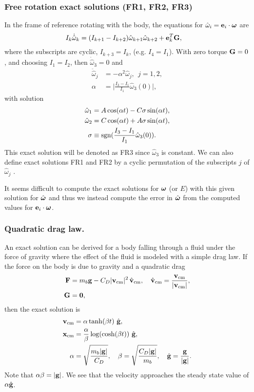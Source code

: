 \subsubsection{Free rotation exact solutions (FR1, FR2, FR3)} 

In the frame of reference rotating with the body, the equations for $\hat\omega_i = \mathbf{ e}_i\cdot\boldsymbol{\omega}$ are 
\begin{align*}
  I_k \dot{\hat\omega}_k  &= (I_{k+1}-I_{k+2}) \hat\omega_{k+1}\hat\omega_{k+2}  + \mathbf{ e}_k^T\mathbf{ G},
\end{align*}
where the subscripts are cyclic, $I_{k+3} = I_{k}$,  (e.g. $I_{4}=I_{1}$).
With zero torque $\mathbf{ G}=0$, and choosing $I_1=I_2$,  then $\dot{\hat\omega}_3=0$ and 
\begin{align*}
  \ddot{\hat\omega}_j  &= -\alpha^2 {\hat\omega}_j , ~~j=1,2, \\
  \alpha &= \Big\vert \frac{I_3-I_1}{I_1} {\hat\omega}_3(0) \Big\vert,
\end{align*}
with solution
\begin{align*}
  {\hat\omega}_1 &= A \cos(\alpha t) - C\sigma \sin(\alpha t), \\
  {\hat\omega}_2 &= C \cos(\alpha t) + A\sigma \sin(\alpha t), \\
  \sigma &\equiv \operatorname{sgn}(\frac{I_3-I_1}{I_1} {\hat\omega}_3(0)).
\end{align*}
This exact solution will be denoted as FR3 since ${\hat\omega}_3$ is constant. We can also define
exact solutions FR1 and FR2 by a cyclic permutation of the subscripts $j$ of ${\hat\omega}_j$ . 

It seems difficult to compute the exact solutions for $\boldsymbol{\omega}$ (or  $E$)
with this given solution for $\hat{\boldsymbol{\omega}}$ and thus we instead compute the error in $\hat{\boldsymbol{\omega}}$
from the computed values for $\mathbf{ e}_i\cdot\boldsymbol{\omega}$. 


\subsubsection{Quadratic drag law.}

An exact solution can be derived for a body falling through a fluid under the force of gravity where
the effect of the fluid is modeled with a simple drag law.
If the force on the body is due to gravity and a quadratic drag
\begin{align*}
  \mathbf{ F} &= m_{b} \mathbf{ g} -  C_D |\mathbf{ v}_{\rm cm}|^2\,\hat{\mathbf{ v}}_{\rm cm} , \quad \hat{\mathbf{ v}}_{\rm cm} =\frac{\mathbf{ v}_{\rm cm}}{|\mathbf{ v}_{\rm cm}|},\\
  \mathbf{ G} &= \mathbf{0},
\end{align*}
then the exact solution is
\begin{align*}
  \mathbf{ v}_{\rm cm} &= \alpha\tanh(\beta t)~\hat{\mathbf{ g}}  , \\
  \mathbf{ x}_{\rm cm} &= \frac{\alpha}{\beta} \log(\cosh(\beta t)) ~\hat{\mathbf{ g}}, \\
  \alpha &= \sqrt{\frac{m_{b} |\mathbf{ g}|}{C_D}}, \quad \beta =\sqrt{\frac{C_D |\mathbf{ g}|}{m_{b}}}, \quad \hat{\mathbf{ g}}=\frac{\mathbf{ g}}{|\mathbf{ g}|}.
\end{align*}
Note that $\alpha\beta=|\mathbf{ g}|$. We see that the velocity approaches the steady state value of $\alpha\hat{\mathbf{ g}}$.

